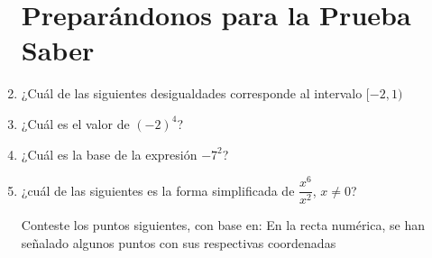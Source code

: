 \documentclass[fleqn]{article}
\begin{document}
\begin{enumerate}
   \section*{Preparándonos para la Prueba Saber}
   \item ¿Cuál de las siguientes desigualdades corresponde al intervalo $[-2,1)$
  \begin{enumerate}
  \end{enumerate}
  \item ¿Cuál es el valor de $(-2)^{4}$?
  \begin{enumerate}
  \end{enumerate}
  \item ¿Cuál es la base de la expresión $-7^{2}$?
  \begin{enumerate}
  \end{enumerate}
  \item ¿cuál de las siguientes es la forma simplificada de $\dfrac{x^{6}}{x^{2}}$, $x\neq 0$?
  \begin{enumerate}
  \end{enumerate}
Conteste los puntos siguientes, con base en: En la recta numérica, se han señalado algunos puntos con sus respectivas coordenadas
  

\end{enumerate}
\end{document}
